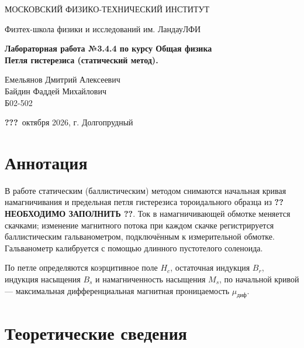 \documentclass[a4paper,12pt]{article}
\newcommand{\qq}{\textbf{???}}
\newcommand{\fillme}{\textbf{?? НЕОБХОДИМО ЗАПОЛНИТЬ ??}}
\begin{document}
\begin{titlepage}
\begin{center}
    {\large МОСКОВСКИЙ ФИЗИКО-ТЕХНИЧЕСКИЙ ИНСТИТУТ}
\end{center}
\begin{center}
    {\large Физтех-школа физики и исследований им. Ландау\break ЛФИ}
\end{center}

    \vspace{3cm}

\vspace{0.15cm}
{
\begin{center}
    \huge \bf Лабораторная работа №3.4.4 по курсу Общая физика\\
    \vspace{0.4cm}
    \LARGE Петля гистерезиса (статический метод).
\end{center}
}
\vspace{1.5cm}
\begin{flushright}
Емельянов Дмитрий Алексеевич\\
Байдин Фаддей Михайлович\\
\vspace{0.4cm}
Б02-502
\end{flushright}
\vspace{10cm}
\begin{center}
    \large \qq\ октября 2026, г. Долгопрудный
\end{center}
\end{titlepage}

\section{Аннотация}
В работе статическим (баллистическим) методом снимаются начальная кривая
намагничивания и предельная петля гистерезиса тороидального образца из
\fillme. Ток в намагничивающей обмотке меняется скачками; изменение
магнитного потока при каждом скачке регистрируется баллистическим
гальванометром, подключённым к измерительной обмотке. Гальванометр
калибруется с помощью длинного пустотелого соленоида.

По петле определяются коэрцитивное поле $H_c$, остаточная индукция $B_r$,
индукция насыщения $B_s$ и намагниченность насыщения $M_s$, по начальной
кривой --- максимальная дифференциальная магнитная проницаемость
$\mu_{\text{диф}}$.

\section{Теоретические сведения}
\end{document}
